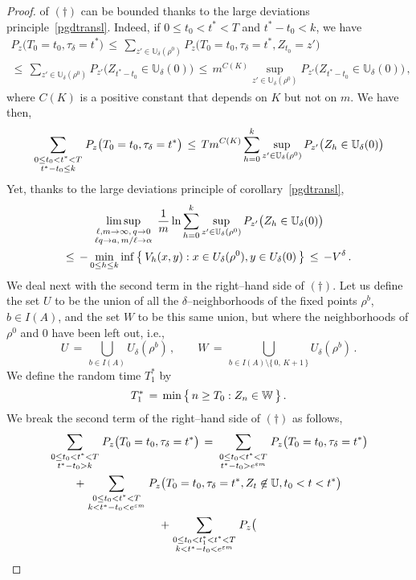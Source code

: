 \documentclass[a4paper,12pt]{article}
\theoremstyle{definition}
\theoremstyle{remark}
\def \a {\alpha}
\def \d {\delta}
\def \e {\varepsilon}
\def \dU {\mathbb{U}}
\def \W {\mathbb{W}}
\begin{document}
\begin{proof}
of $(\dag)$
can be bounded thanks to the large deviations principle~\ref{pgdtransl}.
Indeed, if $0\leq t_0<t^*<T$
and $t^*-t_0<k$, we have
\begin{multline*}
P_z\big(
T_0=t_0,\tau_\d=t^*
\big)\,\leq\,
\sum_{z'\in\dU_\d(\rho^0)}P_z\big(
T_0=t_0,\tau_\d=t^*,Z_{t_0}=z'
\big)\\
\leq\,\sum_{z'\in\dU_\d(\rho^0)}P_{z'}\big(
Z_{t^*-t_0}\in\dU_\d(0)
\big)\,\leq\,m^{C(K)}\sup_{z'\in\dU_\d(\rho^0)}P_{z'}\big(
Z_{t^*-t_0}\in\dU_\d(0)
\big)\,,
\end{multline*}
where $C(K)$ is a positive constant that depends on $K$ but not on $m$.
We have then,
\begin{multline*}
\sum_{\genfrac{}{}{0pt}{1}{0\leq t_0<t^*<T}{t^*-t_0\leq k}}P_z\big(
T_0=t_0,\tau_\d=t^*
\big)\,\leq\,
T m^{C(K)}\sum_{h=0}^k\sup_{z'\in\dU_\d(\rho^0)}
P_{z'}\big(
Z_h\in\dU_\d(0)
\big)
\end{multline*}
Yet,
thanks to the large deviations principle of corollary~\ref{pgdtransl},
\begin{multline*}\limsup_{\genfrac{}{}{0pt}{1}{\ell,m\to\infty,\,q\to0}{\ell q\to a,\,m/\ell\to\a}}\,
\frac{1}{m}\ln 
\sum_{h=0}^k\sup_{z'\in\dU_\d(\rho^0)}P_{z'}\big(
Z_h\in\dU_\d(0)
\big)\\\leq\,-\min_{0\leq h\leq k}\inf\big\lbrace\,
V_h(x,y):x\in U_\d(\rho^0), y\in U_\d(0)
\,\big\rbrace\,\leq\,
-V^\d\,.
\end{multline*}
We deal next with the second term in the right--hand side of $(\dag)$.
Let us define the set $U$ to be the union of all 
the $\d$--neighborhoods of the fixed points $\rho^b$, $b\in I(A)$,
and the set $W$ to be this same union, but
where the neighborhoods of $\rho^0$ and $0$ have been left out, i.e.,
$$U\,=\,\bigcup_{b\in I(A)}U_\d(\rho^b)\,,\qquad
W\,=\,\bigcup_{b\in I(A)\setminus\lbrace\,0,\,K+1\,\rbrace}U_\d(\rho^b)\,.$$
We define the random time $T_1^*$ by
$$T_1^*\,=\,\min\big\lbrace\,
n\geq T_0:Z_n\in\W
\,\big\rbrace\,.\\
$$
We break the second term of the right--hand side of $(\dag)$ 
as follows,
\begin{multline*}
\sum_{\genfrac{}{}{0pt}{1}{0\leq t_0<t^*<T}{t^*-t_0>k}}P_z\big(
T_0=t_0,\tau_\d=t^*
\big)\,
=\,\sum_{\genfrac{}{}{0pt}{1}{0\leq t_0<t^*<T}{t^*-t_0>e^{\e m}}}P_z\big(
T_0=t_0,\tau_\d=t^*
\big)
\\
+\sum_{\genfrac{}{}{0pt}{1}{0\leq t_0<t^*<T}{k<t^*-t_0<e^{\e m}}}P_z\big(
T_0=t_0,\tau_\d=t^*, Z_t\not\in\dU,t_0<t<t^*
\big)
\\
+\sum_{\genfrac{}{}{0pt}{1}{0\leq t_0<t_1^*<t^*<T}{k<t^*-t_0<e^{\e m}}}P_z\big(

\end{multline*}
\end{proof}
\end{document}
